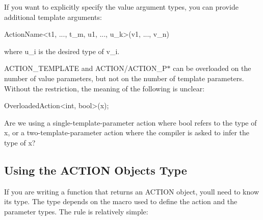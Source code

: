 If you want to explicitly specify the value argument types, you can provide additional template arguments\+: 
\begin{DoxyCode}
ActionName<t1, ..., t\_m, u1, ..., u\_k>(v1, ..., v\_n)
\end{DoxyCode}
 where {\ttfamily u\+\_\+i} is the desired type of {\ttfamily v\+\_\+i}.

{\ttfamily A\+C\+T\+I\+O\+N\+\_\+\+T\+E\+M\+P\+L\+A\+TE} and {\ttfamily A\+C\+T\+I\+ON}/{\ttfamily A\+C\+T\+I\+O\+N\+\_\+\+P$\ast$} can be overloaded on the number of value parameters, but not on the number of template parameters. Without the restriction, the meaning of the following is unclear\+:


\begin{DoxyCode}
OverloadedAction<int, bool>(x);
\end{DoxyCode}


Are we using a single-\/template-\/parameter action where {\ttfamily bool} refers to the type of {\ttfamily x}, or a two-\/template-\/parameter action where the compiler is asked to infer the type of {\ttfamily x}?

\subsection*{Using the A\+C\+T\+I\+ON Object\textquotesingle{}s Type}

If you are writing a function that returns an {\ttfamily A\+C\+T\+I\+ON} object, you\textquotesingle{}ll need to know its type. The type depends on the macro used to define the action and the parameter types. The rule is relatively simple\+:

